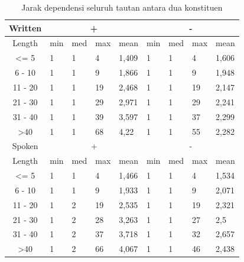 \documentclass[10pt, a4paper, conference, compsocconf]{IEEEtran}
\begin{document}
\begin{table}
\begin{center}
\caption{Jarak dependensi seluruh tautan antara dua konstituen}  \label{tab:deskriptif-konstituen}
\begin{tabular}{c l l l l l l l l }
\hline
Written & \multicolumn{4}{c}{+} & \multicolumn{4}{c}{-} & \\ 
\hline
Length & min & med	& max & mean & min & med & max & mean & \\
\textless= 5 	& 1 & 1 & 4 & 1,409 	& 1 & 1 & 4 & 1,606 & \\
6 - 10 		& 1 & 1 & 9 & 1,866 	& 1 & 1 & 9 & 1,948 & \\
11 - 20 		& 1 & 1 & 19 & 2,468 & 1 & 1 & 19 & 2,147 & \\
21 - 30 		& 1 & 1 & 29 & 2,971 & 1 & 1 & 29 & 2,241 & \\ 
31 - 40 		& 1 & 1 & 39 & 3,597 & 1 & 1 & 37 & 2,299 & \\
\textgreater 40 & 1 & 1 & 68 & 4,22 	& 1 & 1 & 55 & 2,282 & \\ 
\hline
Spoken & \multicolumn{4}{c}{+} & \multicolumn{4}{c}{-} & \\ 
Length & min & med	& max & mean & min & med & max & mean & \\
\textless= 5 	& 1 & 1 & 4 & 1,466 	& 1 & 1 & 4 & 1,534 & \\
6 - 10 		& 1 & 1 & 9 & 1,933 	& 1 & 1 & 9 & 2,071 & \\
11 - 20 		& 1 & 2 & 19 & 2,535 & 1 & 1 & 19 & 2,321 & \\
21 - 30 		& 1 & 2 & 28 & 3,263 & 1 & 1 & 27 & 2,5 & \\ 
31 - 40 		& 1 & 2 & 37 & 3,718 & 1 & 1 & 32 & 2,657 & \\
\textgreater 40 & 1 & 2 & 66 & 4,067 	& 1 & 1 & 46 & 2,438 & \\ 
\hline
   \end{tabular}
\end{center}
\end{table}
\end{document}
